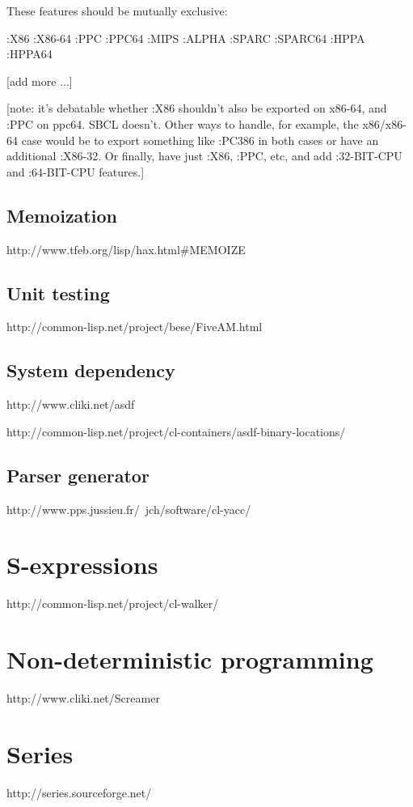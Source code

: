 \documentclass[10pt,english]{book}
\begin{document}
These features should be mutually exclusive:

  :X86
  :X86-64
  :PPC
  :PPC64
  :MIPS
  :ALPHA
  :SPARC
  :SPARC64
  :HPPA
  :HPPA64

[add more ...]

[note: it's debatable whether :X86 shouldn't also be exported on
x86-64, and :PPC on ppc64.  SBCL doesn't.  Other ways
to handle, for example, the x86/x86-64 case would be to export
something like :PC386 in both cases or have an additional :X86-32. Or
finally, have just :X86, :PPC, etc, and add :32-BIT-CPU and
:64-BIT-CPU features.]

\section{Memoization}
\label{sec:memoization}

http://www.tfeb.org/lisp/hax.html\#MEMOIZE

\section{Unit testing}
\label{sec:unit-testing}

http://common-lisp.net/project/bese/FiveAM.html

\section{System dependency}
\label{sec:system-dependency}

http://www.cliki.net/asdf

http://common-lisp.net/project/cl-containers/asdf-binary-locations/

\section{Parser generator}
\label{sec:parser-generator}

http://www.pps.jussieu.fr/~jch/software/cl-yacc/



\chapter{S-expressions}
\label{cha:s-expressions}

http://common-lisp.net/project/cl-walker/


\chapter{Non-deterministic programming}
\label{cha:non-determ-progr}

http://www.cliki.net/Screamer


\chapter{Series}
\label{cha:series}

http://series.sourceforge.net/



\printindex



\end{document}
